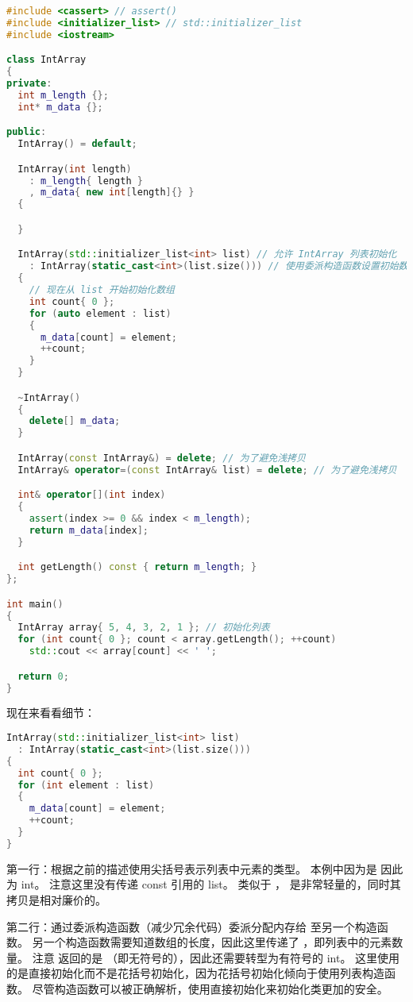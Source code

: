 \documentclass[../../LearnCpp.tex]{subfiles}
\begin{document}
\begin{lstlisting}[language=C++]
#include <cassert> // assert()
#include <initializer_list> // std::initializer_list
#include <iostream>

class IntArray
{
private:
  int m_length {};
  int* m_data {};

public:
  IntArray() = default;

  IntArray(int length)
    : m_length{ length }
    , m_data{ new int[length]{} }
  {

  }

  IntArray(std::initializer_list<int> list) // 允许 IntArray 列表初始化
    : IntArray(static_cast<int>(list.size())) // 使用委派构造函数设置初始数组
  {
    // 现在从 list 开始初始化数组
    int count{ 0 };
    for (auto element : list)
    {
      m_data[count] = element;
      ++count;
    }
  }

  ~IntArray()
  {
    delete[] m_data;
  }

  IntArray(const IntArray&) = delete; // 为了避免浅拷贝
  IntArray& operator=(const IntArray& list) = delete; // 为了避免浅拷贝

  int& operator[](int index)
  {
    assert(index >= 0 && index < m_length);
    return m_data[index];
  }

  int getLength() const { return m_length; }
};

int main()
{
  IntArray array{ 5, 4, 3, 2, 1 }; // 初始化列表
  for (int count{ 0 }; count < array.getLength(); ++count)
    std::cout << array[count] << ' ';

  return 0;
}
\end{lstlisting}

现在来看看细节：

\begin{lstlisting}[language=C++]
IntArray(std::initializer_list<int> list)
  : IntArray(static_cast<int>(list.size()))
{
  int count{ 0 };
  for (int element : list)
  {
    m_data[count] = element;
    ++count;
  }
}
\end{lstlisting}

第一行：根据之前的描述使用尖括号表示列表中元素的类型。
本例中因为是  因此为 int。
注意这里没有传递 const 引用的 list。
类似于 ， 是非常轻量的，同时其拷贝是相对廉价的。

第二行：通过委派构造函数（减少冗余代码）委派分配内存给  至另一个构造函数。
另一个构造函数需要知道数组的长度，因此这里传递了 ，即列表中的元素数量。
注意  返回的是 （即无符号的），因此还需要转型为有符号的 int。
这里使用的是直接初始化而不是花括号初始化，因为花括号初始化倾向于使用列表构造函数。
尽管构造函数可以被正确解析，使用直接初始化来初始化类更加的安全。
\end{document}
